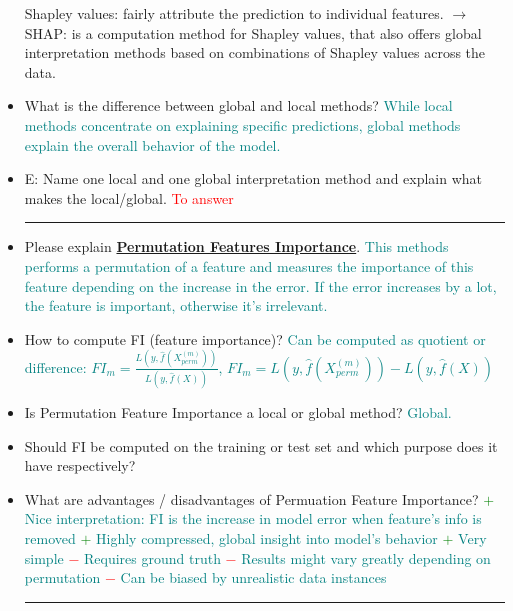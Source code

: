 \documentclass{report}
\newcommand{\asw}[2][teal]{}
\renewcommand{\asw}[2][teal]{\textcolor{#1}{#2}}
\newcommand{\qst}[2][red]{\textcolor{#1}{#2}}
\begin{document}
\begin{itemize}
{		\newline Shapley values: fairly attribute the prediction to individual features.
		\newline $\rightarrow$ SHAP: is a computation method for Shapley values, that also offers global interpretation
		methods based on combinations of Shapley values across the data.}
	\item What is the difference between global and local methods?
	\asw{\newline While local methods concentrate on explaining specific predictions, global methods explain the overall behavior of the model.}
	\item E: Name one local and one global interpretation method and explain what makes the local/global.
	\asw{\newline \qst{To answer}}
	\newline
	\hrule 
	
	\item Please explain \textbf{\underline{Permutation Features Importance}}.
	\asw{\newline This methods performs a permutation of a feature and measures the importance of this feature depending on the increase in the error. If the error increases by a lot, the feature is important, otherwise it's irrelevant.}
	\item How to compute FI (feature importance)?
	\asw{\newline Can be computed as quotient or difference: $FI_m = \frac{L(y, \hat{f}(X^{(m)}_{perm}))}{L(y, \hat{f}(X))}$, $FI_m = L(y, \hat{f}(X^{(m)}_{perm})) - L(y, \hat{f}(X))$}
	\item Is Permutation Feature Importance a  local or global method?
	\asw{\newline Global.}
	\item Should FI be computed on the training or test set and which purpose does it have respectively?
	\asw{\newline }
	\item What are advantages / disadvantages of Permuation Feature Importance?
	\asw{\newline \textcolor{green}{$+$} Nice interpretation: FI is the increase in model error when feature's info is removed
		\newline \textcolor{green}{$+$} Highly compressed, global insight into model's behavior
		\newline \textcolor{green}{$+$} Very simple
		\newline \textcolor{red}{$-$} Requires ground truth
		\newline \textcolor{red}{$-$} Results might vary greatly depending on permutation
		\newline \textcolor{red}{$-$} Can be biased by unrealistic data instances}
	\newline
	\hrule 
	

\end{itemize}
\end{document}

